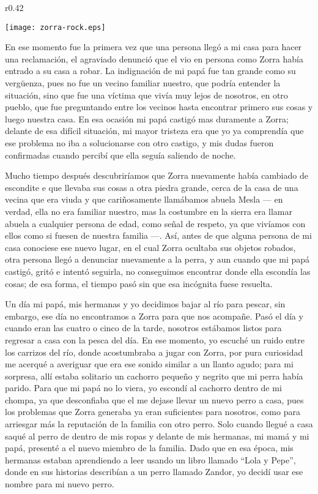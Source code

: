 \begin{wrapfigure}{r}{0.42\textwidth}
  \begin{center}
  \vspace{-10pt}
    \texttt{[image: zorra-rock.eps]}
  \end{center}
  \vspace{-20pt}
\end{wrapfigure}
En ese momento fue la primera vez que una persona llegó a mi casa para hacer una reclamación, el agraviado denunció que el vio en persona como Zorra había entrado a su casa a robar.
La indignación de mi papá fue tan grande como su vergüenza, pues no fue un vecino familiar nuestro, que podría entender la situación, sino que fue una víctima que vivía muy lejos de nosotros, en otro pueblo, que fue preguntando entre los vecinos hasta encontrar primero sus cosas y luego nuestra casa.
En esa ocasión mi papá castigó mas duramente a Zorra; delante de esa difícil situación, mi mayor tristeza era que yo ya comprendía que ese problema no iba a solucionarse con otro castigo, y mis dudas fueron confirmadas cuando percibí que ella seguía saliendo de noche.

Mucho tiempo después descubriríamos que Zorra nuevamente había cambiado de escondite e que llevaba sus cosas a otra piedra grande, cerca de la casa de una vecina que era viuda y que cariñosamente llamábamos abuela Mesla --- en verdad, ella no era familiar nuestro, mas la costumbre en la sierra era llamar abuela a cualquier persona de edad, como señal de respeto, ya que vivíamos con ellos como si fuesen de nuestra familia ---.
Así, antes de que alguna persona de mi casa conociese ese nuevo lugar, en el cual Zorra ocultaba sus objetos robados, otra persona llegó a denunciar nuevamente a la perra, y aun cuando que mi papá castigó, gritó e intentó seguirla, no conseguimos encontrar donde ella escondía las cosas; de esa forma, el tiempo pasó sin que esa incógnita fuese resuelta.

Un día mi papá, mis hermanas y yo decidimos bajar al río para pescar, sin embargo, ese día no encontramos a Zorra para que nos acompañe. Pasó el día y cuando eran las cuatro o cinco de la tarde, nosotros estábamos listos para regresar a casa con la pesca del día. En ese momento, yo escuché un ruido entre los carrizos del río, donde acostumbraba a jugar con Zorra, por pura curiosidad me acerqué a averiguar que era ese sonido similar a un llanto agudo; para mi sorpresa, allí estaba solitario un cachorro pequeño y negrito que mi perra había parido.
Para que mi papá no lo viera, yo escondí al cachorro dentro de mi chompa, ya que desconfiaba que el me dejase llevar un nuevo perro a casa, pues los problemas que Zorra generaba ya eran suficientes para nosotros, como para arriesgar más la reputación de la familia con otro perro.
Solo cuando llegué a casa saqué al perro de dentro de mis ropas y delante de mis hermanas, mi mamá y mi papá, presenté a el nuevo miembro de la familia. Dado que en esa época, mis hermanas estaban aprendiendo a leer usando un libro llamado ``Lola y Pepe'', donde en sus historias describían a un perro llamado Zandor, yo decidí usar ese nombre para mi nuevo perro.

